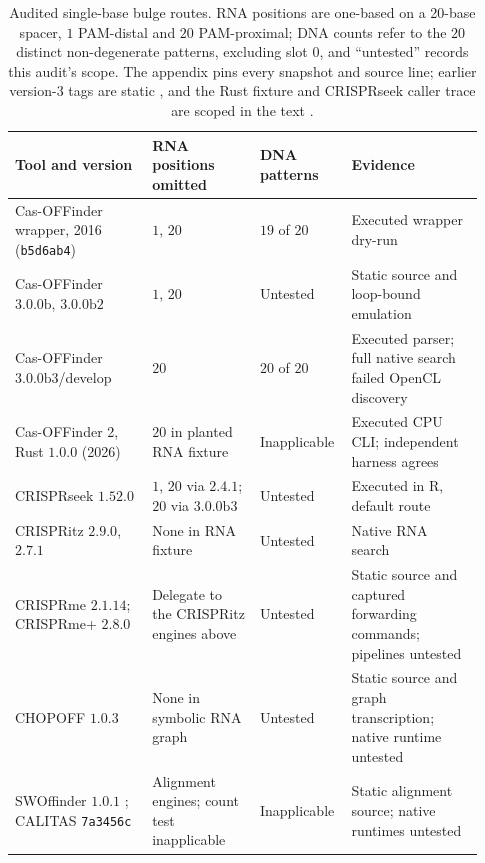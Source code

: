 \begin{table}[!tbp]
\centering
\caption{Audited single-base bulge routes. RNA positions are one-based on a 20-base
spacer, $1$ PAM-distal and $20$ PAM-proximal; DNA counts refer to the $20$ distinct
non-degenerate patterns, excluding slot $0$, and ``untested'' records this audit's scope.
The appendix pins every snapshot and source line; earlier version-3 tags are static
\citep{casoffinder_v3_tags_2026}, and the Rust fixture and CRISPRseek caller trace are
scoped in the text \citep{casoffinder2_rust_2026,crisprseek_1531_source,fieldlevel_audit_2026}.}
\label{tab:tool-audit}
\small
\setlength{\tabcolsep}{4pt}
\renewcommand{\arraystretch}{1.12}
\begin{tabular}{@{}p{0.29\linewidth}p{0.22\linewidth}p{0.15\linewidth}p{0.27\linewidth}@{}}
\toprule
\raggedright Tool and version &\raggedright RNA positions omitted &\raggedright DNA patterns &\raggedright Evidence \tabularnewline
\midrule
\raggedright Cas-OFFinder wrapper, 2016 (\texttt{b5d6ab4}) &\raggedright $1$, $20$ &\raggedright $19$ of $20$ &\raggedright Executed wrapper dry-run \tabularnewline
\raggedright Cas-OFFinder $3.0.0\mathrm{b}$, $3.0.0\mathrm{b}2$ &\raggedright $1$, $20$ &\raggedright Untested &\raggedright Static source and loop-bound emulation \tabularnewline
\raggedright Cas-OFFinder $3.0.0\mathrm{b}3$/develop &\raggedright $20$ &\raggedright $20$ of $20$ &\raggedright Executed parser; full native search failed OpenCL discovery \tabularnewline
\raggedright Cas-OFFinder 2, Rust $1.0.0$ (2026) &\raggedright $20$ in planted RNA fixture &\raggedright Inapplicable &\raggedright Executed CPU CLI; independent harness agrees \tabularnewline
\raggedright CRISPRseek $1.52.0$ &\raggedright $1$, $20$ via $2.4.1$; $20$ via $3.0.0\mathrm{b}3$ &\raggedright Untested &\raggedright Executed in R, default route \tabularnewline
\raggedright CRISPRitz $2.9.0$, $2.7.1$ &\raggedright None in RNA fixture &\raggedright Untested &\raggedright Native RNA search \tabularnewline
\raggedright CRISPRme $2.1.14$; CRISPRme+ $2.8.0$ &\raggedright Delegate to the CRISPRitz engines above &\raggedright Untested &\raggedright Static source and captured forwarding commands; pipelines untested \tabularnewline
\raggedright CHOPOFF $1.0.3$ &\raggedright None in symbolic RNA graph &\raggedright Untested &\raggedright Static source and graph transcription; native runtime untested \tabularnewline
\raggedright SWOffinder $1.0.1$ \citep{yaish2023swoffinder}; CALITAS \texttt{7a3456c} &\raggedright Alignment engines; count test inapplicable &\raggedright Inapplicable &\raggedright Static alignment source; native runtimes untested \tabularnewline
\bottomrule
\end{tabular}
\end{table}

